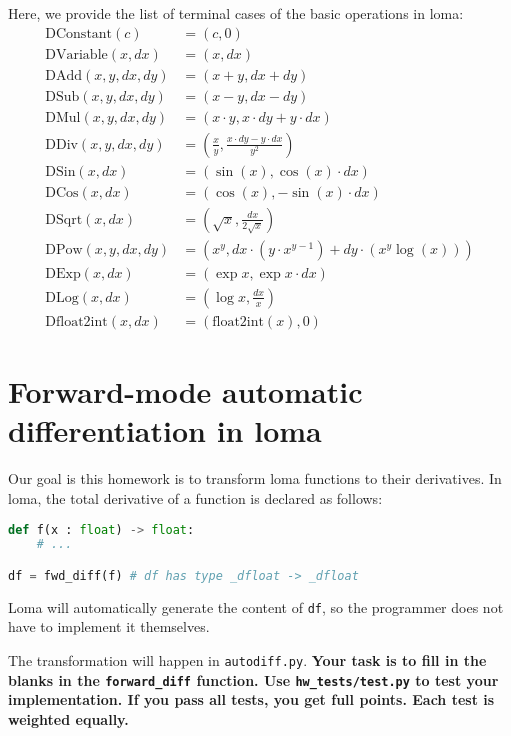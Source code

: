 Here, we provide the list of terminal cases of the basic operations in loma:
\begin{equation}
\begin{aligned}
\text{DConstant}(c) &= (c, 0) \\
\text{DVariable}(x, dx) &= (x, dx) \\
\text{DAdd}(x, y, dx, dy) &= (x + y, dx + dy) \\
\text{DSub}(x, y, dx, dy) &= (x - y, dx - dy) \\
\text{DMul}(x, y, dx, dy) &= (x \cdot y, x \cdot dy + y \cdot dx) \\
\text{DDiv}(x, y, dx, dy) &= \left(\frac{x}{y}, \frac{x \cdot dy - y \cdot dx}{y^2}\right) \\
\text{DSin}(x, dx) &= \left(\sin(x), \cos(x) \cdot dx\right) \\
\text{DCos}(x, dx) &= \left(\cos(x), -\sin(x) \cdot dx\right) \\
\text{DSqrt}(x, dx) &= \left(\sqrt{x}, \frac{dx}{2\sqrt{x}}\right) \\
\text{DPow}(x, y, dx, dy) &= \left(x^y, dx \cdot \left(y \cdot x^{y-1}\right) + dy \cdot \left(x^y \log(x)\right)\right) \\
\text{DExp}(x, dx) &= \left(\exp{x}, \exp{x} \cdot dx\right) \\
\text{DLog}(x, dx) &= \left(\log{x}, \frac{dx}{x}\right) \\
\text{Dfloat2int}(x, dx) &= \left(\text{float2int}(x), 0\right)
\end{aligned}
\end{equation}

\section{Forward-mode automatic differentiation in loma}

Our goal is this homework is to transform loma functions to their derivatives. In loma, the total derivative of a function is declared as follows:
\begin{lstlisting}[language=Python]
def f(x : float) -> float:
	# ...

df = fwd_diff(f) # df has type _dfloat -> _dfloat
\end{lstlisting}

Loma will automatically generate the content of \lstinline{df}, so the programmer does not have to implement it themselves.

The transformation will happen in \lstinline{autodiff.py}. \textbf{Your task is to fill in the blanks in the \lstinline{forward_diff} function. Use \lstinline{hw_tests/test.py} to test your implementation. If you pass all tests, you get full points. Each test is weighted equally.}

